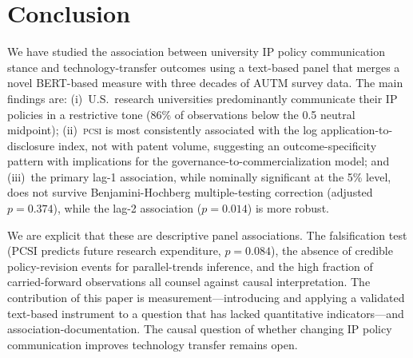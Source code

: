 \documentclass[12pt]{article}
\newcommand{\PCSI}{\textsc{pcsi}}
\begin{document}
\section{Conclusion}
\label{sec:conclusion}

We have studied the association between university IP policy communication stance and
technology-transfer outcomes using a text-based panel that merges a novel BERT-based
measure with three decades of AUTM survey data. The main findings are: (i)~U.S.\ research
universities predominantly communicate their IP policies in a restrictive tone (86\% of
observations below the 0.5 neutral midpoint); (ii)~\PCSI{} is most consistently
associated with the log application-to-disclosure index, not with patent volume,
suggesting an outcome-specificity pattern with implications for the governance-to-commercialization
model; and (iii)~the primary lag-1 association, while nominally significant at the 5\%
level, does not survive Benjamini-Hochberg multiple-testing correction (adjusted
$p=0.374$), while the lag-2 association ($p=0.014$) is more robust.

We are explicit that these are descriptive panel associations. The falsification test
(PCSI predicts future research expenditure, $p=0.084$), the absence of credible
policy-revision events for parallel-trends inference, and the high fraction of
carried-forward observations all counsel against causal interpretation. The contribution
of this paper is measurement---introducing and applying a validated text-based instrument
to a question that has lacked quantitative indicators---and association-documentation.
The causal question of whether changing IP policy communication improves technology
transfer remains open.

\end{document}
